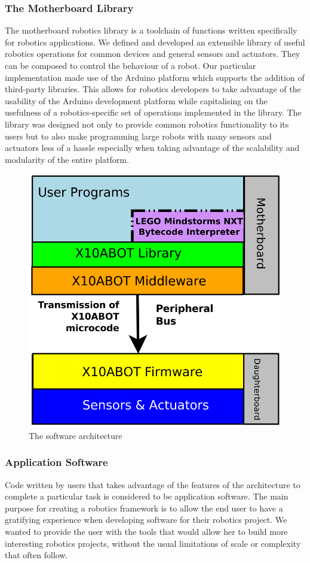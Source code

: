 	\subsubsection{The Motherboard Library} %
	\label{ssub:the_motherboard_library}

	
	The motherboard robotics library is a toolchain of functions written specifically for robotics applications. We defined and developed an extensible library of useful robotics operations for common devices and general sensors and actuators. They can be composed to control the behaviour of a robot. Our particular implementation made use of the Arduino platform which supports the addition of third-party libraries. This allows for robotics developers to take advantage of the usability of the Arduino development platform while capitalising on the usefulness of a robotics-specific set of operations implemented in the library.
The library was designed not only to provide common robotics functionality to its users but to also make programming large robots with many sensors and actuators less of a hassle especially when taking advantage of the scalability and modularity of the entire platform.

	\begin{figure}[h]
	  \begin{center}
	    \includegraphics[width=0.7\columnwidth]{Figures/system.pdf}
	    \caption{The \xten software architecture}
	  \end{center}
	\end{figure}
	
	


	\subsubsection{Application Software} %
	\label{ssub:application_software}
	Code written by users that takes advantage of the features of the \xten architecture to complete a particular task is considered to be application software. The main purpose for creating a robotics framework is to allow the end user to have a gratifying experience when developing software for their robotics project. We wanted to provide the user with the tools that would allow her to build more interesting robotics projects, without the usual limitations of scale or complexity that often follow. 
	

